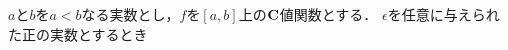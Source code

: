 	\begin{screen}
		\begin{dfn}[絶対連続関数]
			$a$と$b$を$a < b$なる実数とし，$f$を$[a,b]$上の$\mathbf{C}$値関数とする．
			$\epsilon$を任意に与えられた正の実数とするとき
		\end{dfn}
	\end{screen}
	
	\begin{screen}
		\begin{thm}[絶対連続関数は有界変動である]
		\end{thm}
	\end{screen}
	
	\begin{screen}
		\begin{thm}[絶対連続な非減少関数は可測集合を可測集合に写す]
			
		\end{thm}
	\end{screen}